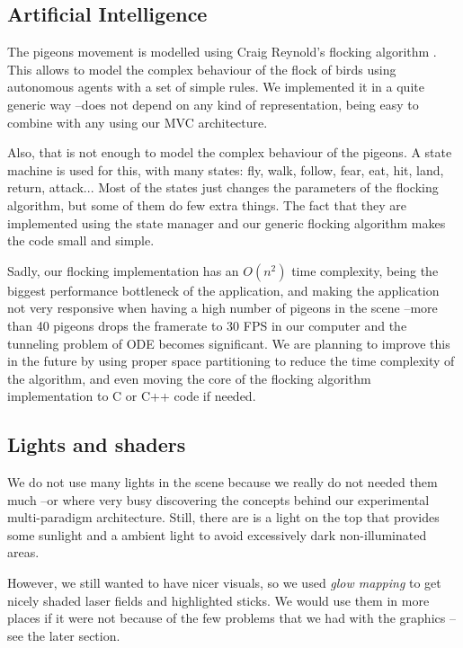 \documentclass[a4paper,10pt]{article}
\begin{document}
\subsection{Artificial Intelligence}

The pigeons movement is modelled using Craig Reynold's flocking
algorithm \cite{flocks}\cite{gamealgo}. This allows to model the
complex behaviour of the flock of birds using autonomous agents with a
set of simple rules. We implemented it in a quite generic way --does not
depend on any kind of representation, being easy to combine with any
using our MVC architecture.

Also, that is not enough to model the complex behaviour of the
pigeons. A state machine is used for this, with many states: fly,
walk, follow, fear, eat, hit, land, return, attack... Most of the
states just changes the parameters of the flocking algorithm, but some
of them do few extra things. The fact that they are implemented using
the state manager and our generic flocking algorithm makes the code
small and simple.

Sadly, our flocking implementation has an $O(n^2)$ time complexity,
being the biggest performance bottleneck of the application, and
making the application not very responsive when having a high number
of pigeons in the scene --more than 40 pigeons drops the framerate to
30 FPS in our computer and the tunneling problem of ODE becomes
significant. We are planning to improve this in the future by using
proper space partitioning to reduce the time complexity of the
algorithm\cite{partitioning}, and even moving the core of the flocking
algorithm implementation to C or C++ code if needed.

\subsection{Lights and shaders}

We do not use many lights in the scene because we really do not needed
them much --or where very busy discovering the concepts behind our
experimental multi-paradigm architecture. Still, there are is a light
on the top that provides some sunlight and a ambient light to avoid
excessively dark non-illuminated areas.

However, we still wanted to have nicer visuals, so we used \emph{glow
  mapping} to get nicely shaded laser fields and highlighted
sticks. We would use them in more places if it were not because of the
few problems that we had with the graphics --see the later section.
\end{document}
